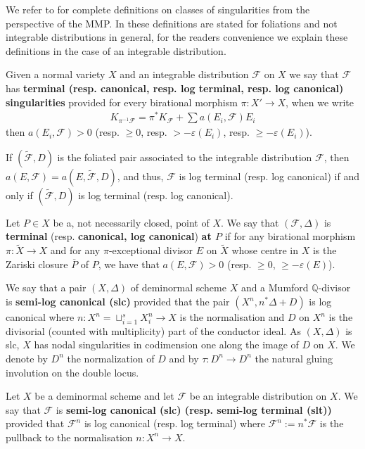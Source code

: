 \documentclass[12pt, a4paper]{amsart}
\theoremstyle{definition}
\theoremstyle{named}
\begin{document}
We refer to 
\cite{KM98, Kollar13, CS20}
for complete definitions
on classes of singularities from the perspective of the MMP.
In \cite{CS20} these definitions are stated for foliations and not integrable distributions in general, for the readers convenience we explain these definitions in the case of an integrable distribution.


Given a normal variety $X$ and an integrable distribution $\mathcal F$ on $X$ 
we say that $\mathcal F$ has {\bf terminal (resp. canonical, resp. log terminal, resp. log canonical) singularities} 
provided for every birational morphism $\pi\colon X' \rightarrow X$, when we write 
\begin{align*}K_{\pi^{-1}\mathcal F} = \pi^*K_{\mathcal F}+\sum a(E_i, \mathcal F)E_i\end{align*}
then $a(E_i, \mathcal F) > 0$ (resp. $\geq 0$, resp. $>-\varepsilon(E_i)$, resp. $\ge -\varepsilon(E_i)$).

If 
$(\tilde{\mathcal F}, D)$ 
is the foliated pair associated to the integrable distribution 
$\mathcal F$, 
then 
$a(E, \mathcal F) = a(E, \tilde{\mathcal F}, D)$, 
and thus, 
$\mathcal F$ is log terminal (resp. log canonical) if and only if $(\tilde {\mathcal F}, D)$
is log terminal (resp. log canonical).

Let $P \in X$ be a, not necessarily closed, point of $X$.
We  say  that $(\mathcal F, \Delta)$ is {\bf terminal} (resp. {\bf canonical, log canonical})
{\bf at $P$} if
for any birational morphism $\pi\colon \widetilde X\to X$ and for any  $\pi$-exceptional  divisor $E$ on $\widetilde X$ whose centre in $X$ is the Zariski closure $\overline P$ of $P$,
we have that $a(E, \mathcal F)>0$ (resp. $\geq 0$, $\geq -\varepsilon(E)$).



We say that a pair 
$(X, 
\Delta)$ of deminormal scheme $X$
and a Mumford $\mathbb Q$-divisor is {\bf semi-log canonical (slc)} provided that 
the pair $(X^n, n^*\Delta+D)$ is log canonical where 
$n \colon X^n=\sqcup_{i=1}^{s} X_i^n \to X$ 
is the normalisation and
$D$ 
on 
$X^n$
is the divisorial (counted with multiplicity)
part of the conductor ideal.
As $(X, \Delta)$ is slc, 
$X$ has nodal singularities in codimension one along the image of $D$ on $X$.
We denote by 
$D^n$
the normalization of $D$ 
and by 
$\tau 
\colon 
D^n \to D^n$
the natural gluing involution on the double locus.


Let $X$ be a deminormal scheme and let $\mathcal F$ be an integrable distribution on $X$. We say that $\mathcal F$ is {\bf semi-log canonical (slc) (resp. semi-log terminal (slt))} provided
that $\mathcal F^n$ is log canonical (resp. log terminal)
where $\mathcal F^n:=n^\ast \mathcal F$ is the pullback to the normalisation $n \colon X^n \to X$.
\end{document}
